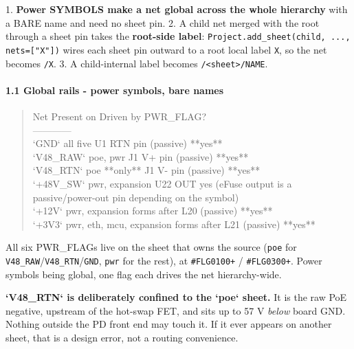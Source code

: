 \documentclass[11pt,a4paper]{article}
\begin{document}
1. \textbf{Power SYMBOLS make a net global across the whole hierarchy} with a BARE name and need no sheet pin. 2. A child net merged with the root through a sheet pin takes the \textbf{root-side label}: \texttt{Project.add\_sheet(child, ..., nets={[}"X"{]})} wires each sheet pin outward to a root local label \texttt{X}, so the net becomes \texttt{/X}. 3. A child-internal label becomes \texttt{/\textless{}sheet\textgreater{}/NAME}.

\paragraph*{1.1 Global rails - power symbols, bare names}
\begin{quote}\small\ttfamily\raggedright
\textbar{} Net \textbar{} Present on \textbar{} Driven by \textbar{} PWR\_FLAG? \textbar{}\\
\textbar{}---\textbar{}---\textbar{}---\textbar{}---\textbar{}\\
\textbar{} `GND` \textbar{} all five \textbar{} U1 RTN pin (passive) \textbar{} {*}{*}yes{*}{*} \textbar{}\\
\textbar{} `V48\_RAW` \textbar{} poe, pwr \textbar{} J1 V+ pin (passive) \textbar{} {*}{*}yes{*}{*} \textbar{}\\
\textbar{} `V48\_RTN` \textbar{} poe {*}{*}only{*}{*} \textbar{} J1 V- pin (passive) \textbar{} {*}{*}yes{*}{*} \textbar{}\\
\textbar{} `+48V\_SW` \textbar{} pwr, expansion \textbar{} U22 OUT \textbar{} yes (eFuse output is a passive/power-out pin depending on the symbol) \textbar{}\\
\textbar{} `+12V` \textbar{} pwr, expansion \textbar{} forms after L20 (passive) \textbar{} {*}{*}yes{*}{*} \textbar{}\\
\textbar{} `+3V3` \textbar{} pwr, eth, mcu, expansion \textbar{} forms after L21 (passive) \textbar{} {*}{*}yes{*}{*} \textbar{}
\end{quote}
All six PWR\_FLAGs live on the sheet that owns the source (\texttt{poe} for \texttt{V48\_RAW}/\texttt{V48\_RTN}/\texttt{GND}, \texttt{pwr} for the rest), at \texttt{\#FLG0100+} / \texttt{\#FLG0300+}. Power symbols being global, one flag each drives the net hierarchy-wide.

\textbf{`V48\_RTN` is deliberately confined to the `poe` sheet.} It is the raw PoE negative, upstream of the hot-swap FET, and sits up to 57 V \emph{below} board GND. Nothing outside the PD front end may touch it. If it ever appears on another sheet, that is a design error, not a routing convenience.
\end{document}
